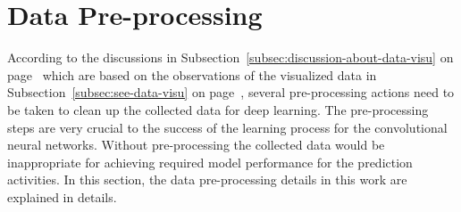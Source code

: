 \section{Data Pre-processing}\label{sec:data-preprocessing}
According to the discussions in 
Subsection~\ref{subsec:discussion-about-data-visu}
on page~\pageref{subsec:discussion-about-data-visu}
which are based on the observations
of the visualized data in
Subsection~\ref{subsec:see-data-visu}
on page~\pageref{subsec:see-data-visu},
several pre-processing actions need
to be taken to clean up the collected data for deep learning.
The pre-processing steps are very crucial to the success
of the learning process for the convolutional neural networks.
Without pre-processing the collected data would be inappropriate 
for achieving required model performance for the prediction
activities.
In this section, the data pre-processing details in this work
are explained in details.

